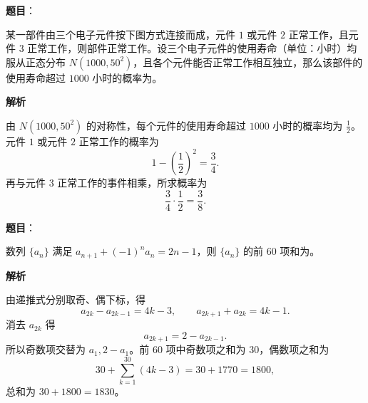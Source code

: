 \begin{answer}

\textbf{题目}：

某一部件由三个电子元件按下图方式连接而成，元件 $1$ 或元件 $2$ 正常工作，且元件 $3$ 正常工作，则部件正常工作。设三个电子元件的使用寿命（单位：小时）均服从正态分布 $N(1000,50^2)$，且各个元件能否正常工作相互独立，那么该部件的使用寿命超过 $1000$ 小时的概率为\gkblank{}。
\nopagebreak[4]
\begin{center}\end{center}
\nopagebreak[4]
\textbf{解析}

由 $N(1000,50^2)$ 的对称性，每个元件的使用寿命超过 $1000$ 小时的概率均为 $\frac12$。元件 $1$ 或元件 $2$ 正常工作的概率为
\nopagebreak[4]
\[
1-\left(\frac12\right)^2=\frac34.
\]
再与元件 $3$ 正常工作的事件相乘，所求概率为
\nopagebreak[4]
\[
\frac34\cdot\frac12=\frac38.
\]


\end{answer}
\begin{answer}

\textbf{题目}：

数列 $\{a_n\}$ 满足 $a_{n+1}+(-1)^n a_n=2n-1$，则 $\{a_n\}$ 的前 $60$ 项和为\gkblank{}。

\textbf{解析}

由递推式分别取奇、偶下标，得
\nopagebreak[4]
\[
a_{2k}-a_{2k-1}=4k-3,\qquad
a_{2k+1}+a_{2k}=4k-1.
\]
消去 $a_{2k}$ 得
\nopagebreak[4]
\[
a_{2k+1}=2-a_{2k-1}.
\]
所以奇数项交替为 $a_1,2-a_1$。前 $60$ 项中奇数项之和为 $30$，偶数项之和为
\nopagebreak[4]
\[
30+\sum_{k=1}^{30}(4k-3)=30+1770=1800,
\]
总和为 $30+1800=1830$。


\end{answer}
